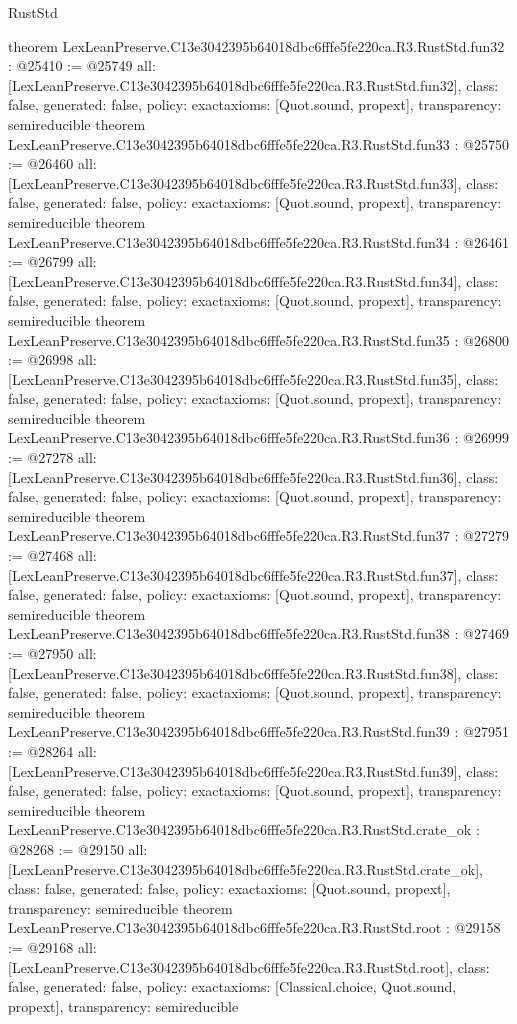 \begin{lexlean}{RustStd}
\begin{coremodule}
{}
theorem LexLeanPreserve.C13e3042395b64018dbc6fffe5fe220ca.R3.RustStd.fun32 : @25410 := @25749 {
  all: [LexLeanPreserve.C13e3042395b64018dbc6fffe5fe220ca.R3.RustStd.fun32],
  class: false,
  generated: false,
  policy: exact{axioms: [Quot.sound, propext]},
  transparency: semireducible
}
theorem LexLeanPreserve.C13e3042395b64018dbc6fffe5fe220ca.R3.RustStd.fun33 : @25750 := @26460 {
  all: [LexLeanPreserve.C13e3042395b64018dbc6fffe5fe220ca.R3.RustStd.fun33],
  class: false,
  generated: false,
  policy: exact{axioms: [Quot.sound, propext]},
  transparency: semireducible
}
theorem LexLeanPreserve.C13e3042395b64018dbc6fffe5fe220ca.R3.RustStd.fun34 : @26461 := @26799 {
  all: [LexLeanPreserve.C13e3042395b64018dbc6fffe5fe220ca.R3.RustStd.fun34],
  class: false,
  generated: false,
  policy: exact{axioms: [Quot.sound, propext]},
  transparency: semireducible
}
theorem LexLeanPreserve.C13e3042395b64018dbc6fffe5fe220ca.R3.RustStd.fun35 : @26800 := @26998 {
  all: [LexLeanPreserve.C13e3042395b64018dbc6fffe5fe220ca.R3.RustStd.fun35],
  class: false,
  generated: false,
  policy: exact{axioms: [Quot.sound, propext]},
  transparency: semireducible
}
theorem LexLeanPreserve.C13e3042395b64018dbc6fffe5fe220ca.R3.RustStd.fun36 : @26999 := @27278 {
  all: [LexLeanPreserve.C13e3042395b64018dbc6fffe5fe220ca.R3.RustStd.fun36],
  class: false,
  generated: false,
  policy: exact{axioms: [Quot.sound, propext]},
  transparency: semireducible
}
theorem LexLeanPreserve.C13e3042395b64018dbc6fffe5fe220ca.R3.RustStd.fun37 : @27279 := @27468 {
  all: [LexLeanPreserve.C13e3042395b64018dbc6fffe5fe220ca.R3.RustStd.fun37],
  class: false,
  generated: false,
  policy: exact{axioms: [Quot.sound, propext]},
  transparency: semireducible
}
theorem LexLeanPreserve.C13e3042395b64018dbc6fffe5fe220ca.R3.RustStd.fun38 : @27469 := @27950 {
  all: [LexLeanPreserve.C13e3042395b64018dbc6fffe5fe220ca.R3.RustStd.fun38],
  class: false,
  generated: false,
  policy: exact{axioms: [Quot.sound, propext]},
  transparency: semireducible
}
theorem LexLeanPreserve.C13e3042395b64018dbc6fffe5fe220ca.R3.RustStd.fun39 : @27951 := @28264 {
  all: [LexLeanPreserve.C13e3042395b64018dbc6fffe5fe220ca.R3.RustStd.fun39],
  class: false,
  generated: false,
  policy: exact{axioms: [Quot.sound, propext]},
  transparency: semireducible
}
theorem LexLeanPreserve.C13e3042395b64018dbc6fffe5fe220ca.R3.RustStd.crate_ok : @28268 := @29150 {
  all: [LexLeanPreserve.C13e3042395b64018dbc6fffe5fe220ca.R3.RustStd.crate_ok],
  class: false,
  generated: false,
  policy: exact{axioms: [Quot.sound, propext]},
  transparency: semireducible
}
theorem LexLeanPreserve.C13e3042395b64018dbc6fffe5fe220ca.R3.RustStd.root : @29158 := @29168 {
  all: [LexLeanPreserve.C13e3042395b64018dbc6fffe5fe220ca.R3.RustStd.root],
  class: false,
  generated: false,
  policy: exact{axioms: [Classical.choice, Quot.sound, propext]},
  transparency: semireducible
}


\end{coremodule}
\end{lexlean}
